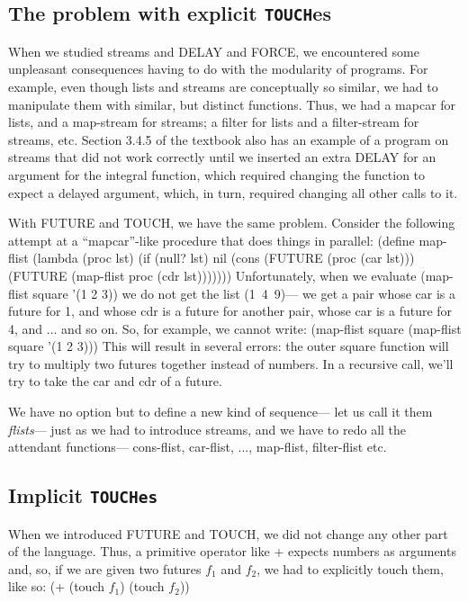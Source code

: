 \subsection{The problem with explicit {\tt TOUCH}es}

When we studied streams and {\cf DELAY} and {\cf FORCE}, we encountered
some unpleasant consequences having to do with the modularity of programs.
For example, even though lists and streams are conceptually so similar, we
had to manipulate them with similar, but distinct functions.  Thus, we had a
{\cf mapcar} for lists, and a {\cf map-stream} for streams; a {\cf filter}
for lists and a {\cf filter-stream} for streams, etc.  Section 3.4.5 of the
textbook also has an example of a program on streams that did not work
correctly until we inserted an extra {\cf DELAY} for an argument for the
{\cf integral} function, which required changing the function to expect a
delayed argument, which, in turn, required changing all other calls to it.

With {\cf FUTURE} and {\cf TOUCH}, we have the same problem.  Consider the
following attempt at a ``{\cf mapcar}''-like procedure that does things in
parallel:
\beginlisp
(define map-flist (lambda (proc lst)
    (if (null? lst)
        nil
        (cons (FUTURE (proc (car lst)))
              (FUTURE (map-flist proc (cdr lst)))))))
\endlisp
Unfortunately, when we evaluate
\beginlisp
(map-flist square '(1 2 3))
\endlisp
we do not get the list \mbox{\cf (1 4 9)}--- we get a pair whose car is a
future for 1, and whose cdr is a future for another pair, whose car is a
future for 4, and ... and so on.  So, for example, we cannot write:
\beginlisp
(map-flist square (map-flist square '(1 2 3)))
\endlisp
 This will result in several errors:  the outer {\cf square} function will
try to multiply two futures together instead of numbers.  In a recursive
call, we'll try to take the {\cf car} and {\cf cdr} of a future.

We have no option but to define a new kind of sequence--- let us call it them
{\em flists\/}--- just as we had to introduce streams, and we have to redo all
the attendant functions---  {\cf cons-flist}, {\cf car-flist}, ...,
{\cf map-flist}, {\cf filter-flist} etc.

\subsection{Implicit {\tt TOUCHes}}

When we introduced {\cf FUTURE} and {\cf TOUCH},  we did not change any other
part of the language.  Thus, a primitive operator like {\cf +} expects
numbers as arguments and, so, if we are given two futures $f_1$ and $f_2$, we
had to explicitly touch them, like so:
\beginlisp
(+ (touch $f_1$) (touch $f_2$))
\endlisp

